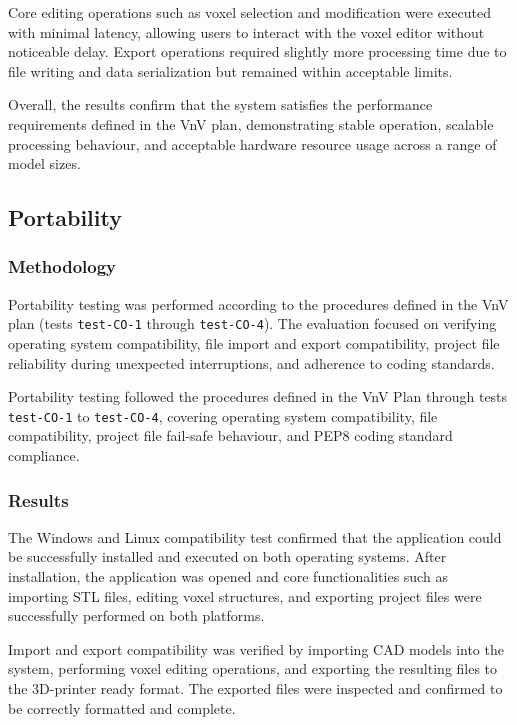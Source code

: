 \documentclass[12pt, titlepage]{article}
\begin{document}
Core editing operations such as voxel selection and modification were executed with minimal latency, allowing users to interact with the voxel editor without noticeable delay. Export operations required slightly more processing time due to file writing and data serialization but remained within acceptable limits.

Overall, the results confirm that the system satisfies the performance requirements defined in the VnV plan, demonstrating stable operation, scalable processing behaviour, and acceptable hardware resource usage across a range of model sizes.
\subsection{Portability}

\subsubsection{Methodology}

Portability testing was performed according to the procedures defined in the VnV plan (tests \texttt{test-CO-1} through \texttt{test-CO-4}). The evaluation focused on verifying operating system compatibility, file import and export compatibility, project file reliability during unexpected interruptions, and adherence to coding standards.

Portability testing followed the procedures defined in the VnV Plan through tests \texttt{test-CO-1} to \texttt{test-CO-4}, covering operating system compatibility, file compatibility, project file fail-safe behaviour, and PEP8 coding standard compliance.

\subsubsection{Results}

The Windows and Linux compatibility test confirmed that the application could be successfully installed and executed on both operating systems. After installation, the application was opened and core functionalities such as importing STL files, editing voxel structures, and exporting project files were successfully performed on both platforms.

Import and export compatibility was verified by importing CAD models into the system, performing voxel editing operations, and exporting the resulting files to the 3D-printer ready format. The exported files were inspected and confirmed to be correctly formatted and complete.
\end{document}
